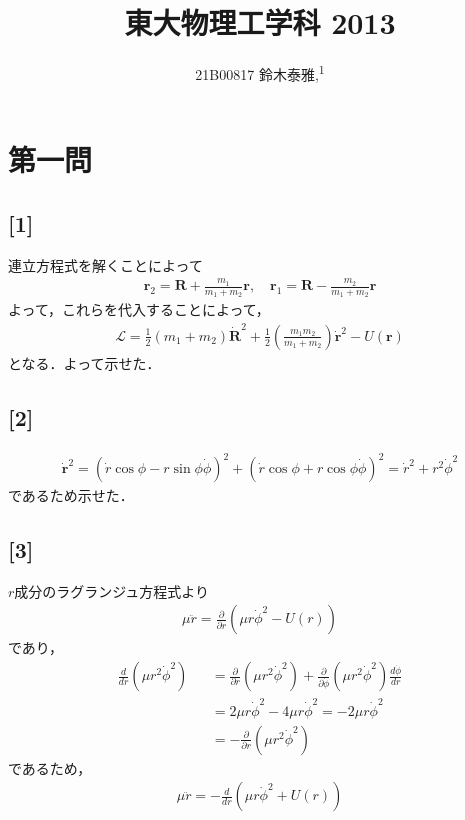 \documentclass[12pt,dvipdfmx]{jsarticle}
\newcommand\authormark[1]{\textsuperscript{#1}}
\begin{document}
\title{東大物理工学科 2013}

\author{21B00817 鈴木泰雅,\authormark{1}}
\section*{\Large{第一問}}
\subsection*{\large{[1]}}
連立方程式を解くことによって
\begin{eqnarray}
  \bm{r}_2 = \bm{R} + \frac{m_1}{m_1+m_2}\bm{r}, \quad \bm{r}_1 = \bm{R} - \frac{m_2}{m_1+m_2}\bm{r}
\end{eqnarray}
よって，これらを代入することによって，
\begin{eqnarray}
  \mathcal{L} = \frac{1}{2}(m_1+m_2)\dot{\bm{R}}^2 + \frac{1}{2}\left( \frac{m_1m_2}{m_1+m_2} \right)\bm{\dot{r}}^2 - U(\bm{r})
\end{eqnarray}
となる．よって示せた．
\subsection*{\large{[2]}}
\begin{eqnarray}
  \bm{\dot{r}}^2= \left( \dot{r}\cos\phi - r\sin\phi\dot{\phi} \right)^2 + \left( \dot{r}\cos\phi +r\cos\phi\dot{\phi} \right)^2 = \dot{r}^2 + r^2\dot{\phi}^2
\end{eqnarray}
であるため示せた．
\subsection*{\large{[3]}}
$r$成分のラグランジュ方程式より 
\begin{eqnarray}
  \mu \ddot{r} = \frac{\partial}{\partial r} \left( \mu r \dot{\phi}^2 -U(r) \right)
\end{eqnarray}
であり，
\begin{eqnarray}
  \frac{d}{dr}\left( \mu r^2\dot{\phi}^2 \right) &&= \frac{\partial}{\partial r}\left(\mu r^2\dot{\phi}^2\right) + \frac{\partial}{\partial \dot{\phi}}\left(\mu r^2\dot{\phi}^2\right) \frac{d\dot{\phi}}{dr}\\
  &&= 2\mu r \dot{\phi}^2 - 4 \mu r \dot{\phi}^2 = - 2\mu r \dot{\phi}^2\\
  &&= - \frac{\partial}{\partial r}\left(\mu r^2\dot{\phi}^2\right)
\end{eqnarray}
であるため，
\begin{eqnarray}
  \mu \ddot{r} = -\frac{d}{d r} \left( \mu r \dot{\phi}^2 +U(r) \right)  
\end{eqnarray}
\newpage
\end{document}

